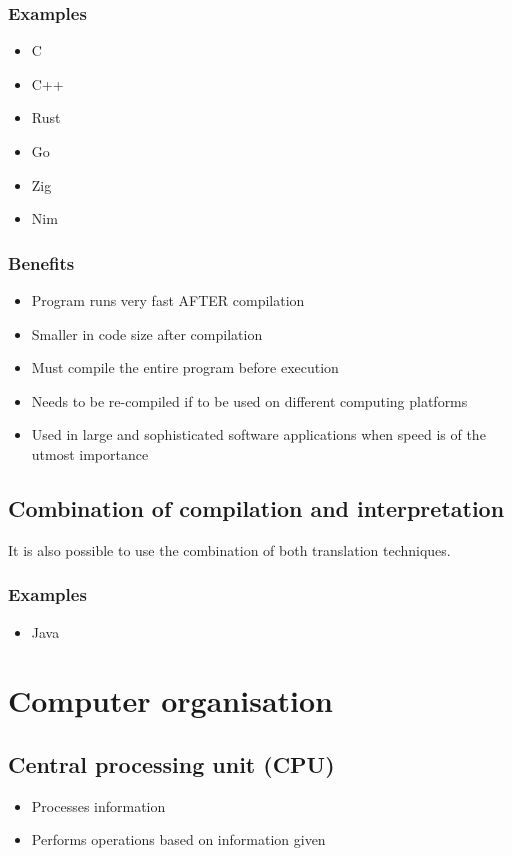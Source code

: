 \documentclass[11pt]{article}
\begin{document}
\subsubsection{Examples}
\label{sec:org74daa91}
\begin{itemize}
\item C
\item C++
\item Rust
\item Go
\item Zig
\item Nim
\end{itemize}

\subsubsection{Benefits}
\label{sec:org7c9643e}
\begin{itemize}
\item Program runs very fast AFTER compilation
\item Smaller in code size after compilation
\item Must compile the entire program before execution
\item Needs to be re-compiled if to be used on different computing platforms
\item Used in large and sophisticated software applications when speed is of the utmost importance
\end{itemize}

\subsection{Combination of compilation and interpretation}
\label{sec:orgaaa6d3e}
It is also possible to use the combination of both translation techniques.

\subsubsection{Examples}
\label{sec:orgccbe4ae}
\begin{itemize}
\item Java
\end{itemize}


\section{Computer organisation}
\label{sec:org19fcc19}

\subsection{Central processing unit (CPU)}
\label{sec:org9eb9eec}
\begin{itemize}
\item Processes information
\item Performs operations based on information given
\end{itemize}
\end{document}
